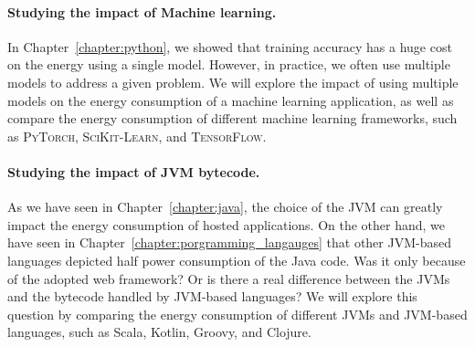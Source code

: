 \paragraph{Studying the impact of Machine learning.}
In Chapter~\ref{chapter:python}, we showed that training accuracy has a huge cost on the energy using a single model.
However, in practice, we often use multiple models to address a given problem.
We will explore the impact of using multiple models on the energy consumption of a machine learning application, as well as compare the energy consumption of different machine learning frameworks, such as \textsc{PyTorch}, \textsc{SciKit-Learn}, and \textsc{TensorFlow}.



\paragraph{Studying the impact of JVM bytecode.}
As we have seen in Chapter~\ref{chapter:java}, the choice of the JVM can greatly impact the energy consumption of hosted applications.
On the other hand, we have seen in Chapter~\ref{chapter:porgramming_langauges} that other JVM-based languages depicted half power consumption of the Java code.
Was it only because of the adopted web framework? 
Or is there a real difference between the JVMs and the bytecode handled by JVM-based languages? 
We will explore this question by comparing the energy consumption of different JVMs and JVM-based languages, such as Scala, Kotlin, Groovy, and Clojure.

